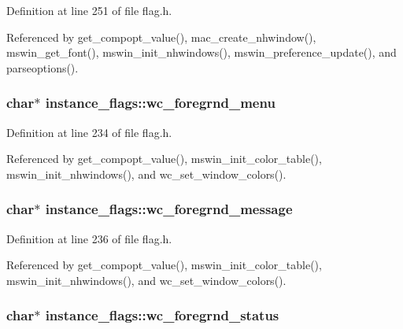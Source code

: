 Definition at line 251 of file flag.\+h.



Referenced by get\+\_\+compopt\+\_\+value(), mac\+\_\+create\+\_\+nhwindow(), mswin\+\_\+get\+\_\+font(), mswin\+\_\+init\+\_\+nhwindows(), mswin\+\_\+preference\+\_\+update(), and parseoptions().

\hypertarget{structinstance__flags_a4854ab0ecbaf931d125e8ddf187bcaa8}{
\subsubsection[{wc\+\_\+foregrnd\+\_\+menu}]{\setlength{\rightskip}{0pt plus 5cm}char$\ast$ instance\+\_\+flags\+::wc\+\_\+foregrnd\+\_\+menu}}\label{structinstance__flags_a4854ab0ecbaf931d125e8ddf187bcaa8}


Definition at line 234 of file flag.\+h.



Referenced by get\+\_\+compopt\+\_\+value(), mswin\+\_\+init\+\_\+color\+\_\+table(), mswin\+\_\+init\+\_\+nhwindows(), and wc\+\_\+set\+\_\+window\+\_\+colors().

\hypertarget{structinstance__flags_a31d2ba572a9da80bba15387b0ebb29c2}{
\subsubsection[{wc\+\_\+foregrnd\+\_\+message}]{\setlength{\rightskip}{0pt plus 5cm}char$\ast$ instance\+\_\+flags\+::wc\+\_\+foregrnd\+\_\+message}}\label{structinstance__flags_a31d2ba572a9da80bba15387b0ebb29c2}


Definition at line 236 of file flag.\+h.



Referenced by get\+\_\+compopt\+\_\+value(), mswin\+\_\+init\+\_\+color\+\_\+table(), mswin\+\_\+init\+\_\+nhwindows(), and wc\+\_\+set\+\_\+window\+\_\+colors().

\hypertarget{structinstance__flags_ab245859108fb1a411f0d98495eee3c7f}{
\subsubsection[{wc\+\_\+foregrnd\+\_\+status}]{\setlength{\rightskip}{0pt plus 5cm}char$\ast$ instance\+\_\+flags\+::wc\+\_\+foregrnd\+\_\+status}}\label{structinstance__flags_ab245859108fb1a411f0d98495eee3c7f}


